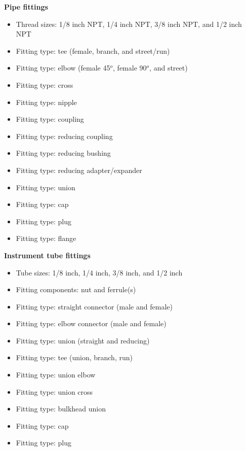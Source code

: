 \noindent
{\bf Pipe fittings}

\begin{itemize}
\item{} Thread sizes: 1/8 inch NPT, 1/4 inch NPT, 3/8 inch NPT, and 1/2 inch NPT
\item{} Fitting type: tee (female, branch, and street/run)
\item{} Fitting type: elbow (female 45$^{o}$, female 90$^{o}$, and street)
\item{} Fitting type: cross
\item{} Fitting type: nipple  %
\item{} Fitting type: coupling  %
\item{} Fitting type: reducing coupling  %
\item{} Fitting type: reducing bushing  %
\item{} Fitting type: reducing adapter/expander  %
\item{} Fitting type: union
\item{} Fitting type: cap  %
\item{} Fitting type: plug  %
\item{} Fitting type: flange
\end{itemize}

\vskip 10pt

\noindent
{\bf Instrument tube fittings}

\begin{itemize}
\item{} Tube sizes: 1/8 inch, 1/4 inch, 3/8 inch, and 1/2 inch
\item{} Fitting components: nut and ferrule(s)
\item{} Fitting type: straight connector (male and female)
\item{} Fitting type: elbow connector (male and female)
\item{} Fitting type: union (straight and reducing)
\item{} Fitting type: tee (union, branch, run)
\item{} Fitting type: union elbow
\item{} Fitting type: union cross
\item{} Fitting type: bulkhead union
\item{} Fitting type: cap
\item{} Fitting type: plug
\end{itemize}

